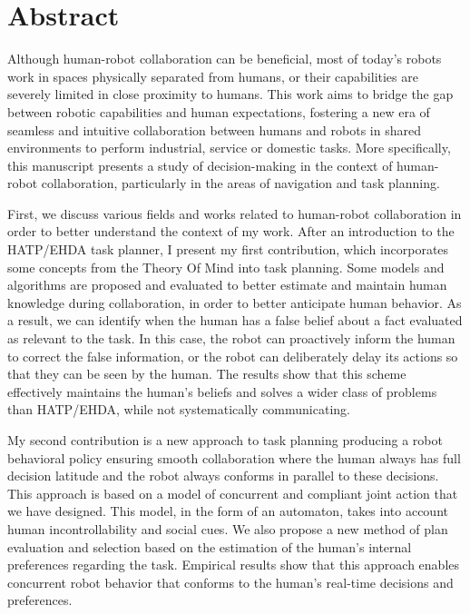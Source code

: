 \chapter*{Abstract}


Although human-robot collaboration can be beneficial, most of today's robots work in spaces physically separated from humans, or their capabilities are severely limited in close proximity to humans. This work aims to bridge the gap between robotic capabilities and human expectations, fostering a new era of seamless and intuitive collaboration between humans and robots in shared environments to perform industrial, service or domestic tasks. More specifically, this manuscript presents a study of decision-making in the context of human-robot collaboration, particularly in the areas of navigation and task planning.

First, we discuss various fields and works related to human-robot collaboration in order to better understand the context of my work. After an introduction to the HATP/EHDA task planner, I present my first contribution, which incorporates some concepts from the Theory Of Mind into task planning. Some models and algorithms are proposed and evaluated to better estimate and maintain human knowledge during collaboration, in order to better anticipate human behavior. As a result, we can identify when the human has a false belief about a fact evaluated as relevant to the task. In this case, the robot can proactively inform the human to correct the false information, or the robot can deliberately delay its actions so that they can be seen by the human. The results show that this scheme effectively maintains the human's beliefs and solves a wider class of problems than HATP/EHDA, while not systematically communicating.

My second contribution is a new approach to task planning producing a robot behavioral policy ensuring smooth collaboration where the human always has full decision latitude and the robot always conforms in parallel to these decisions. This approach is based on a model of concurrent and compliant joint action that we have designed. This model, in the form of an automaton, takes into account human incontrollability and social cues. We also propose a new method of plan evaluation and selection based on the estimation of the human's internal preferences regarding the task. Empirical results show that this approach enables concurrent robot behavior that conforms to the human's real-time decisions and preferences.

